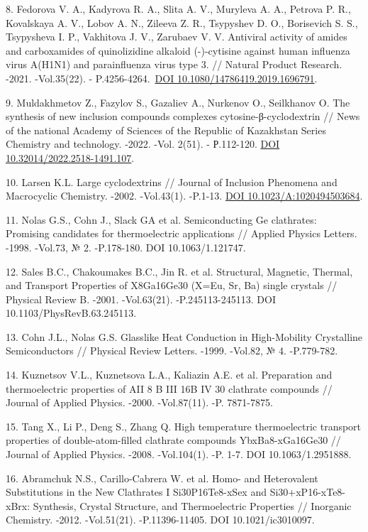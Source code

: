 \begin{refs}
8. Fedorova V. A., Kadyrova R. A., Slita A. V., Muryleva A. A., Petrova
P. R., Kovalskaya A. V., Lobov A. N., Zileeva Z. R., Tsypyshev D. O.,
Borisevich S. S., Tsypysheva I. P., Vakhitova J. V., Zarubaev V. V.
Antiviral activity of amides and carboxamides of quinolizidine alkaloid
(-)-cytisine against human influenza virus A(H1N1) and parainfluenza
virus type 3. // Natural Product Research. -2021. -Vol.35(22). -
P.4256-4264.~\href{https://doi.org/10.1080/14786419.2019.1696791}{DOI
10.1080/14786419.2019.1696791}.

9. Muldakhmetov Z., Fazylov S., Gazaliev A., Nurkenov O., Seilkhanov O.
The synthesis of new inclusion compounds complexes
cytosine-β-cyclodextrin // News of the national Academy of Sciences of
the Repub\-lic of Kazakhstan Series Chemistry and technology. -2022. -Vol.
2(51). - Р.112-120.
\href{https://doi.org/10.32014/2022.2518-1491.107}{DOI\\
10.32014/2022.2518-1491.107}.

10. Larsen K.L. Large cyclodextrins // Journal of Inclusion Phenomena
and Macrocyclic Chemistry. -2002. -Vol.43(1). -P.1-13.
\href{https://doi.org/10.1023/A:1020494503684}{DOI
10.1023/A:1020494503684}.

11. Nolas G.S., Cohn J., Slack GA et al. Semiconducting Ge clathrates:
Promising candidates for thermo\-electric applications // Applied Physics
Letters. -1998. -Vol.73, № 2. -P.178-180. DOI 10.1063/1.121747.

12. Sales B.C., Chakoumakes B.C., Jin R. et al. Structural, Magnetic,
Thermal, and Transport Properties of X8Ga16Ge30 (X=Eu, Sr, Ba) single
crystals // Physical Review B. -2001. -Vol.63(21). -P.245113-245113.
DOI 10.1103/PhysRevB.63.245113.

13. Cohn J.L., Nolas G.S. Glasslike Heat Conduction in High-Mobility
Crystalline Semiconductors // Physical Review Letters. -1999. -Vol.82,
№ 4. -P.779-782.

14. Kuznetsov V.L., Kuznetsova L.A., Kaliazin A.E. et al. Preparation
and thermoelectric properties of AII 8 B III 16B IV 30 clathrate
compounds // Journal of Applied Physics. -2000. -Vol.87(11). -P.
7871-7875.

15. Tang X., Li P., Deng S., Zhang Q. High temperature thermoelectric
transport properties of double-atom-filled clathrate compounds
YbxBa8-xGa16Ge30 // Journal of Applied Physics. -2008. -Vol.104(1). -P.
1-7. DOI 10.1063/1.2951888.

16. Abramchuk N.S., Carillo-Cabrera W. et al. Homo- and Heterovalent
Substitutions in the New Clathrates I Si30P16Te8-xSex and
Si30+xP16-xTe8-xBrx: Synthesis, Crystal Structure, and Thermoelectric
Proper\-ties // Inorganic Chemistry. -2012. -Vol.51(21). -P.11396-11405.
DOI 10.1021/ic3010097.


\end{refs}

